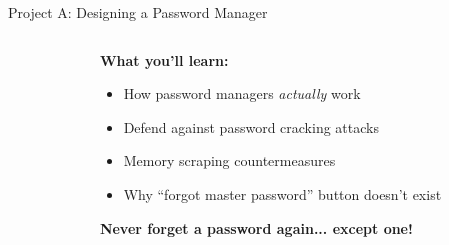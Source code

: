 \documentclass[aspectratio=169, lualatex, handout]{beamer}
\begin{document}
\begin{frame}{Project A: Designing a Password Manager}
	\begin{columns}[c]
		\begin{column}{0.5\textwidth}
		\end{column}
		\begin{column}{0.5\textwidth}
			\textbf{What you'll learn:}
			\begin{itemize}[<+->]
				\item How password managers \textit{actually} work
				\item Defend against password cracking attacks
				\item Memory scraping countermeasures
				\item Why ``forgot master password'' button doesn't exist
			\end{itemize}
			\vspace{0.5cm}
			\textcolor{cipherprimary}{\textbf{Never forget a password again... except one!}}
		\end{column}
	\end{columns}
\end{frame}
\end{document}
